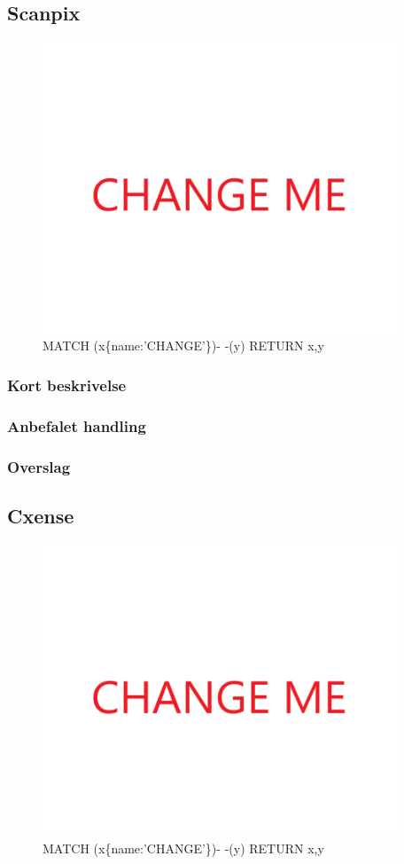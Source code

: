 \documentclass{article}
\begin{document}
\subsection{Scanpix}
\begin{figure}[h]
\includegraphics[width=300pt]{CHANGE.PNG}
\caption{MATCH (x\{name:'CHANGE'\})- -(y) RETURN x,y}
\end{figure}
\subsubsection{Kort beskrivelse}
\subsubsection{Anbefalet handling}
\subsubsection{Overslag}


\subsection{Cxense}
\begin{figure}[h]
\includegraphics[width=300pt]{CHANGE.PNG}
\caption{MATCH (x\{name:'CHANGE'\})- -(y) RETURN x,y}
\end{figure}
\end{document}

